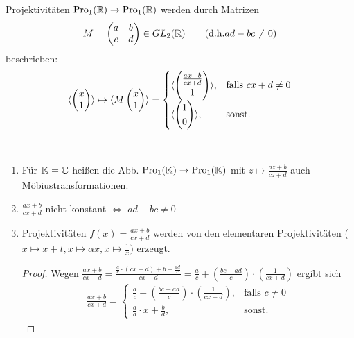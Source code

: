   \begin{bem}
    Projektivitäten $\operatorname{Pro}_1(\mathbb R) \to \operatorname{Pro}_1(\mathbb R)$ werden durch Matrizen
    \begin{align*}
      M = \begin{pmatrix} a & b \\ c & d \end{pmatrix} \in GL_2(\mathbb R) \qquad (\mbox{d.h.} ad-bc \neq 0 )
    \end{align*}
    beschrieben:
    \begin{align*}
      \langle \begin{pmatrix}{x}\\{1}\end{pmatrix} \rangle \mapsto \langle M \begin{pmatrix}{x}\\{1}\end{pmatrix} \rangle 
          = \begin{cases} \langle \begin{pmatrix}{\frac{ax+b}{cx+d}}\\{1}\end{pmatrix} \rangle, & \mbox{falls $cx+d \neq 0$} \\
                          \langle \begin{pmatrix}{1}\\{0}\end{pmatrix} \rangle,                 & \mbox{sonst.}
            \end{cases}
    \end{align*}
  \end{bem}

  \begin{bem} [Möbiustransformationen] \ \\
    \begin{enumerate}
      \item Für $\mathbb K=\mathbb C$ heißen die Abb. $\operatorname{Pro}_1(\mathbb K) \to \operatorname{Pro}_1(\mathbb K)$ mit $\displaystyle{ z\mapsto \frac{az+b}{cz+d}}$ auch Möbiustransformationen.
      \item $\displaystyle{\frac{ax+b}{cx+d}}$ nicht konstant $\Leftrightarrow$ $ad-bc \neq 0$
      \item Projektivitäten $\displaystyle{f(x) = \frac{ax+b}{cx+d}}$ werden von den elementaren Projektivitäten ($x\mapsto x+t, x\mapsto \alpha x, x\mapsto \frac{1}{x})$
            erzeugt. \par
            \begin{proof}
              Wegen $\displaystyle{\frac{ax+b}{cx+d} 
              = \frac{ \frac{a}{c}\cdot (cx+d) + b - \frac{ad}{c} }{cx+d}} = \frac{a}{c} + \left( \frac{bc-ad}{c} \right) \cdot \left( \frac{1}{cx+d} \right)$ ergibt sich
              \begin{align*}
                \frac{ax+b}{cx+d} 
                    = \begin{cases} 
                          \frac{a}{c} + \left( \frac{bc-ad}{c} \right) \cdot \left( \frac{1}{cx+d} \right), & \mbox{falls } c\neq 0 \\
                          \frac{a}{d} \cdot x + \frac{b}{d}, & \mbox{sonst.}
                      \end{cases}
              \end{align*}
            \end{proof}
    \end{enumerate}
  \end{bem}
  
